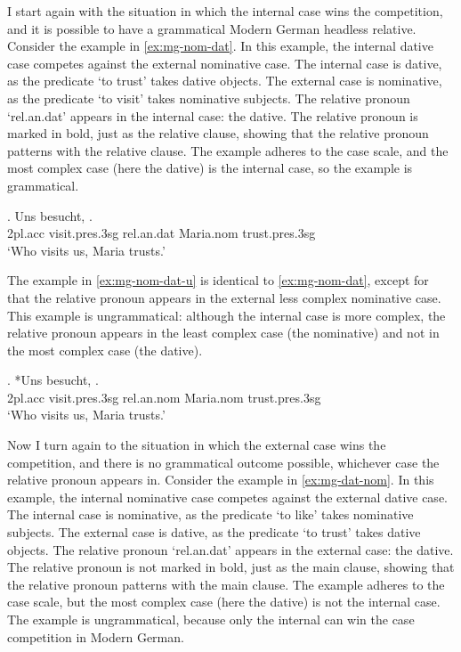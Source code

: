 I start again with the situation in which the internal case wins the competition, and it is possible to have a grammatical Modern German headless relative.
Consider the example in \ref{ex:mg-nom-dat}. In this example, the internal dative case competes against the external nominative case.
The internal case is dative, as the predicate  `to trust' takes dative objects.
The external case is nominative, as the predicate  `to visit' takes nominative subjects.
The relative pronoun  `\ac{rel}.\ac{an}.\ac{dat}' appears in the internal case: the dative. The relative pronoun is marked in bold, just as the relative clause, showing that the relative pronoun patterns with the relative clause.
The example adheres to the case scale, and the most complex case (here the dative) is the internal case, so the example is grammatical.

\exg. Uns besucht,   .\\
2\ac{pl}.\ac{acc} visit.\ac{pres}.3\ac{sg}\scsub{[nom]} \ac{rel}.\ac{an}.\ac{dat} Maria.\ac{nom} trust.\ac{pres}.3\ac{sg}\scsub{[dat]}\\
`Who visits us, Maria trusts.' \label{ex:mg-nom-dat}

The example in \ref{ex:mg-nom-dat-u} is identical to \ref{ex:mg-nom-dat}, except for that the relative pronoun appears in the external less complex nominative case. This example is ungrammatical: although the internal case is more complex, the relative pronoun appears in the least complex case (the nominative) and not in the most complex case (the dative).

\exg. *Uns besucht,   .\\
2\ac{pl}.\ac{acc} visit.\ac{pres}.3\ac{sg}\scsub{[nom]} \ac{rel}.\ac{an}.\ac{nom} Maria.\ac{nom} trust.\ac{pres}.3\ac{sg}\scsub{[dat]}\\
`Who visits us, Maria trusts.' \label{ex:mg-nom-dat-u}

Now I turn again to the situation in which the external case wins the competition, and there is no grammatical outcome possible, whichever case the relative pronoun appears in.
Consider the example in \ref{ex:mg-dat-nom}. In this example, the internal nominative case competes against the external dative case.
The internal case is nominative, as the predicate  `to like' takes nominative subjects.
The external case is dative, as the predicate  `to trust' takes dative objects.
The relative pronoun  `\ac{rel}.\ac{an}.\ac{dat}' appears in the external case: the dative. The relative pronoun is not marked in bold, just as the main clause, showing that the relative pronoun patterns with the main clause.
The example adheres to the case scale, but the most complex case (here the dative) is not the internal case. The example is ungrammatical, because only the internal can win the case competition in Modern German.

